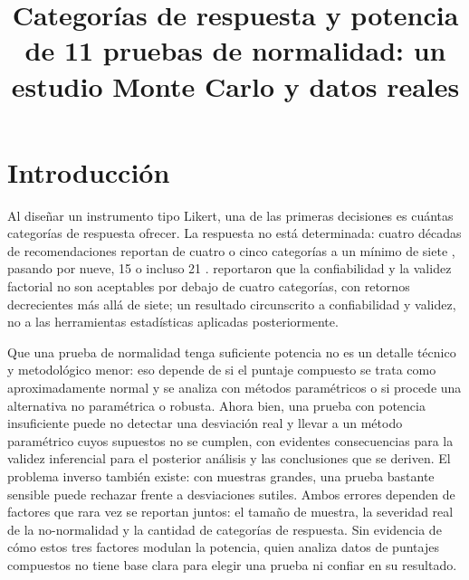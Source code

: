 \documentclass[man,mask,donotrepeattitle,floatsintext]{apa7}
\title{Categorías de respuesta y potencia de 11 pruebas de normalidad: un estudio Monte Carlo y datos reales}
\begin{document}
\maketitle

\section{Introducción}
\label{sec:introduction}

Al diseñar un instrumento tipo Likert, una de las primeras decisiones es cuántas categorías de respuesta ofrecer. La respuesta no está determinada: cuatro décadas de recomendaciones reportan de cuatro o cinco categorías \parencite{dillman2009} a un mínimo de siete \parencite{foddy1994,preston2000}, pasando por nueve, 15 o incluso 21 \parencite{pearse2011}. \textcite{lozano2008} reportaron que la confiabilidad y la validez factorial no son aceptables por debajo de cuatro categorías, con retornos decrecientes más allá de siete; un resultado circunscrito a confiabilidad y validez, no a las herramientas estadísticas aplicadas posteriormente.

Que una prueba de normalidad tenga suficiente potencia no es un detalle técnico y metodológico menor: eso depende de si el puntaje compuesto se trata como aproximadamente normal y se analiza con métodos paramétricos o si procede una alternativa no paramétrica o robusta. Ahora bien, una prueba con potencia insuficiente puede no detectar una desviación real y llevar a un método paramétrico cuyos supuestos no se cumplen, con evidentes consecuencias para la validez inferencial para el posterior análisis y las conclusiones que se deriven. El problema inverso también existe: con muestras grandes, una prueba bastante sensible puede rechazar frente a desviaciones sutiles. Ambos errores dependen de factores que rara vez se reportan juntos: el tamaño de muestra, la severidad real de la no-normalidad y la cantidad de categorías de respuesta. Sin evidencia de cómo estos tres factores modulan la potencia, quien analiza datos de puntajes compuestos no tiene base clara para elegir una prueba ni confiar en su resultado.
\end{document}
